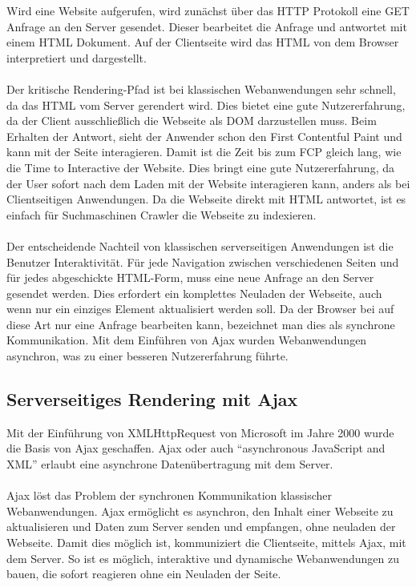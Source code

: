 \documentclass[runningheads]{llncs}
\begin{document}
Wird eine Website aufgerufen, wird zunächst über das HTTP Protokoll 
eine GET Anfrage an den Server gesendet. Dieser bearbeitet die Anfrage 
und antwortet mit einem HTML Dokument. Auf der Clientseite wird das HTML 
von dem Browser interpretiert und dargestellt.
\\
\\
Der kritische Rendering-Pfad ist bei klassischen Webanwendungen sehr schnell, 
da das HTML vom Server gerendert wird. Dies bietet eine gute Nutzererfahrung, 
da der Client ausschließlich die Webseite als DOM darzustellen muss. 
Beim Erhalten der Antwort, sieht der Anwender schon den First Contentful Paint 
und kann mit der Seite interagieren. Damit ist die Zeit bis zum FCP gleich lang, 
wie die Time to Interactive der Website. Dies bringt eine gute Nutzererfahrung, 
da der User sofort nach dem Laden mit der Website interagieren kann, 
anders als bei Clientseitigen Anwendungen. 
Da die Webseite direkt mit HTML antwortet, ist es einfach für Suchmaschinen Crawler 
die Webseite zu indexieren. 
\\
\\
Der entscheidende Nachteil von klassischen serverseitigen Anwendungen 
ist die Benutzer Interaktivität. Für jede Navigation zwischen verschiedenen 
Seiten und für jedes abgeschickte HTML-Form, 
muss eine neue Anfrage an den Server gesendet werden. 
Dies erfordert ein komplettes Neuladen der Webseite, 
auch wenn nur ein einziges Element aktualisiert werden soll. 
Da der Browser bei auf diese Art nur eine Anfrage bearbeiten kann, 
bezeichnet man dies als synchrone Kommunikation. 
Mit dem Einführen von Ajax wurden Webanwendungen asynchron, 
was zu einer besseren Nutzererfahrung führte.

\subsection{Serverseitiges Rendering mit Ajax}
\label{subsec:Serverseitiges Rendering mit Ajax}

Mit der Einführung von XMLHttpRequest von Microsoft im Jahre 2000 wurde die Basis von Ajax geschaffen. 
Ajax oder auch “asynchronous JavaScript and XML” erlaubt eine asynchrone Datenübertragung mit dem Server.
\\
\\

Ajax löst das Problem der synchronen Kommunikation klassischer Webanwendungen. 
Ajax ermöglicht es asynchron, 
den Inhalt einer Webseite zu aktualisieren und Daten zum Server senden und empfangen, 
ohne neuladen der Webseite. Damit dies möglich ist, 
kommuniziert die Clientseite, mittels Ajax, mit dem Server. 
So ist es möglich, interaktive und dynamische Webanwendungen zu bauen, 
die sofort reagieren ohne ein Neuladen der Seite.
\end{document}
